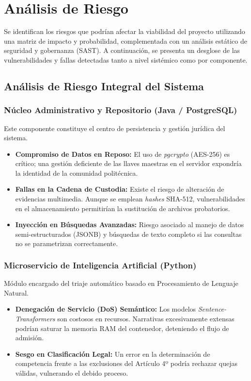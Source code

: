 \section{Análisis de Riesgo}
Se identifican los riesgos que podrían afectar la viabilidad del proyecto utilizando una matriz de impacto y probabilidad, complementada con un análisis estático de seguridad y gobernanza (SAST). A continuación, se presenta un desglose de las vulnerabilidades y fallas detectadas tanto a nivel sistémico como por componente.

\subsection{Análisis de Riesgo Integral del Sistema}

\subsubsection{Núcleo Administrativo y Repositorio (Java / PostgreSQL)}
Este componente constituye el centro de persistencia y gestión jurídica del sistema.
\begin{itemize}
    \item \textbf{Compromiso de Datos en Reposo:} El uso de \textit{pgcrypto} (AES-256) es crítico; una gestión deficiente de las llaves maestras en el servidor expondría la identidad de la comunidad politécnica.
    \item \textbf{Fallas en la Cadena de Custodia:} Existe el riesgo de alteración de evidencias multimedia. Aunque se emplean \textit{hashes} SHA-512, vulnerabilidades en el almacenamiento permitirían la sustitución de archivos probatorios.
    \item \textbf{Inyección en Búsquedas Avanzadas:} Riesgo asociado al manejo de datos semi-estructurados (JSONB) y búsquedas de texto completo si las consultas no se parametrizan correctamente.
\end{itemize}

\subsubsection{Microservicio de Inteligencia Artificial (Python)}
Módulo encargado del triaje automático basado en Procesamiento de Lenguaje Natural.
\begin{itemize}
    \item \textbf{Denegación de Servicio (DoS) Semántico:} Los modelos \textit{Sentence-Transformers} son costosos en recursos. Narrativas excesivamente extensas podrían saturar la memoria RAM del contenedor, deteniendo el flujo de admisión.
    \item \textbf{Sesgo en Clasificación Legal:} Un error en la determinación de competencia frente a las exclusiones del Artículo 4º podría rechazar quejas válidas, vulnerando el debido proceso.
\end{itemize}

